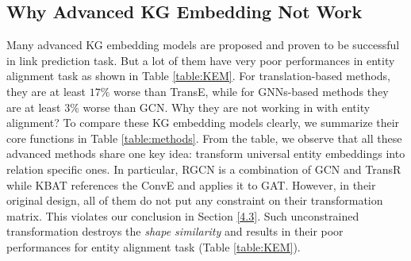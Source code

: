 \documentclass[sigconf,camera-ready]{acmart}
\begin{document}
\subsection{Why Advanced KG Embedding Not Work}
Many advanced KG embedding models are proposed and proven to be successful in link prediction task.
But a lot of them have very poor performances in entity alignment task as shown in Table \ref{table:KEM}.
For translation-based methods, they are at least $17\%$ worse than TransE, while for GNNs-based methods they are at least $3\%$ worse than GCN.
Why they are not working in with entity alignment?
To compare these KG embedding models clearly, we summarize their core functions in Table \ref{table:methods}.
From the table, we observe that all these advanced methods share one key idea:
transform universal entity embeddings into relation specific ones.
In particular, RGCN is a combination of GCN and TransR while KBAT references the ConvE and applies it to GAT.
However, in their original design, all of them do not put any constraint on their transformation matrix.
This violates our conclusion in Section \ref{4.3}.
Such unconstrained transformation destroys the \emph{shape similarity} and results in their poor performances for entity alignment task (Table \ref{table:KEM}).
\begin{table}[t]
\renewcommand\arraystretch{1.3}
\centering
{}
\caption{Performance of different KGs embedding models in entity alignment. * represents the result is taken from \citet{DBLP:conf/semweb/SunHHCGQ19}. Other results are produced by ourselves.}
\label{table:KEM}
\end{table}
\end{document}

